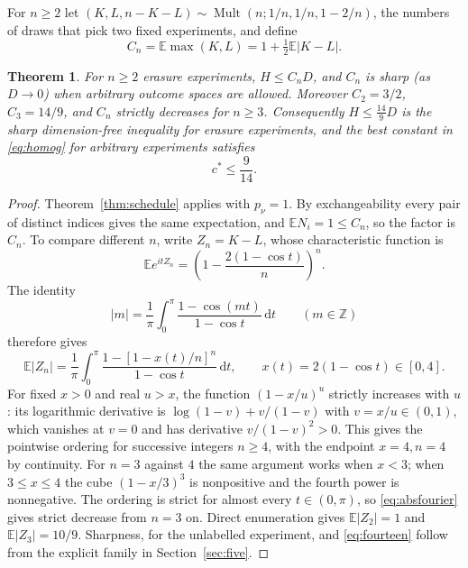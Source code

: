 \documentclass[11pt,a4paper]{article}
\newtheorem{theorem}{Theorem}[section]
\theoremstyle{definition}\newtheorem{definition}[theorem]{Definition}
\theoremstyle{remark}\newtheorem{remark}[theorem]{Remark}
\newcommand{\E}{\mathbb E}
\newcommand{\dd}{\mathrm d}
\DeclareMathOperator{\Mult}{Mult}
\begin{document}
For $n\ge2$ let $(K,L,n-K-L)\sim\Mult(n;1/n,1/n,1-2/n)$, the numbers of draws that pick two fixed experiments, and define
\begin{equation}\label{eq:Cn}
 C_n=\E\max(K,L)=1+\tfrac12\E|K-L|.
\end{equation}
\begin{theorem}\label{thm:uniform}
For $n\ge2$ erasure experiments, $H\le C_nD$, and $C_n$ is sharp (as $D\to0$) when arbitrary outcome spaces are allowed. Moreover $C_2=3/2$, $C_3=14/9$, and $C_n$ strictly decreases for $n\ge3$. Consequently $H\le\frac{14}{9}D$ is the sharp dimension-free inequality for erasure experiments, and the best constant in \eqref{eq:homog} for arbitrary experiments satisfies
\begin{equation}\label{eq:fourteen}
c^*\le \frac{9}{14}.
\end{equation}
\end{theorem}
\begin{proof}
Theorem~\ref{thm:schedule} applies with $p_\nu=1$. By exchangeability every pair of distinct indices gives the same expectation, and $\E N_i=1\le C_n$, so the factor is $C_n$. To compare different $n$, write $Z_n=K-L$, whose characteristic function is
\[
\E e^{itZ_n}=\left(1-\frac{2(1-\cos t)}n\right)^n.
\]
The identity
\[
|m|=\frac1\pi\int_0^\pi\frac{1-\cos(mt)}{1-\cos t}\,\dd t\qquad(m\in\mathbb Z)
\]
therefore gives
\begin{equation}\label{eq:absfourier}
\E|Z_n|=\frac1\pi\int_0^\pi
\frac{1-[1-x(t)/n]^n}{1-\cos t}\,\dd t,\qquad x(t)=2(1-\cos t)\in[0,4].
\end{equation}
For fixed $x>0$ and real $u>x$, the function $(1-x/u)^u$ strictly increases with $u$: its logarithmic derivative is $\log(1-v)+v/(1-v)$ with $v=x/u\in(0,1)$, which vanishes at $v=0$ and has derivative $v/(1-v)^2>0$. This gives the pointwise ordering for successive integers $n\ge4$, with the endpoint $x=4,n=4$ by continuity. For $n=3$ against $4$ the same argument works when $x<3$; when $3\le x\le4$ the cube $(1-x/3)^3$ is nonpositive and the fourth power is nonnegative. The ordering is strict for almost every $t\in(0,\pi)$, so \eqref{eq:absfourier} gives strict decrease from $n=3$ on. Direct enumeration gives $\E|Z_2|=1$ and $\E|Z_3|=10/9$. Sharpness, for the unlabelled experiment, and \eqref{eq:fourteen} follow from the explicit family in Section~\ref{sec:five}.
\end{proof}
\end{document}
